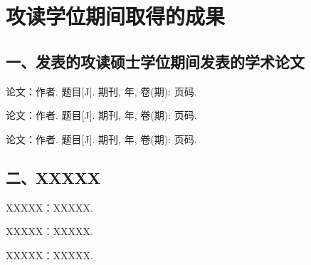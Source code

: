 \chapter*{攻读学位期间取得的成果}

\section*{一、发表的攻读硕士学位期间发表的学术论文}
\begin{enumerate}[label={[\arabic*]}]
  \item 
  论文：作者. 题目[J]. 期刊, 年, 卷(期): 页码.
  \item 
  论文：作者. 题目[J]. 期刊, 年, 卷(期): 页码.
  \item 
  论文：作者. 题目[J]. 期刊, 年, 卷(期): 页码.
\end{enumerate}

\section*{二、XXXXX}
\begin{enumerate}[label={[\arabic*]}]
  \item 
  XXXXX：XXXXX.
  \item 
  XXXXX：XXXXX.
    \item 
  XXXXX：XXXXX.
\end{enumerate}
